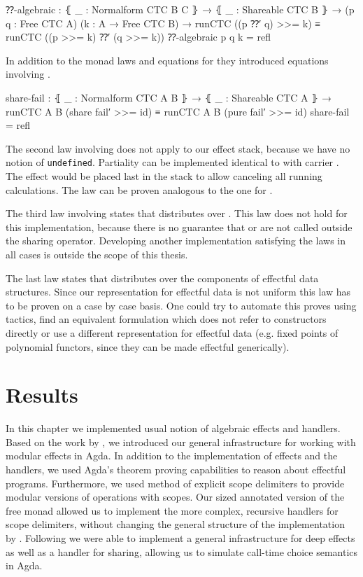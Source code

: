 \begin{code}
⁇-algebraic : ⦃ _ : Normalform CTC B C ⦄ → ⦃ _ : Shareable CTC B ⦄ →
  (p q : Free CTC A) (k : A → Free CTC B) →
  runCTC ((p ⁇′ q) >>= k) ≡ runCTC ((p >>= k) ⁇′ (q >>= k))
⁇-algebraic p q k = refl
\end{code}
In addition to the monad laws and equations for  they introduced
equations involving .

\begin{code}
share-fail : ⦃ _ : Normalform CTC A B ⦄ → ⦃ _ : Shareable CTC A ⦄ →
  runCTC {A} {B} (share fail′ >>= id) ≡ runCTC {A} {B} (pure fail′ >>= id)
share-fail = refl
\end{code}
The second law involving  does not apply to our effect
stack, because we have no notion of \texttt{undefined}.
Partiality can be implemented identical to  with carrier
.
The effect would be placed last in the stack to allow canceling all running
calculations.
The law can be proven analogous to the one for .

The third law involving  states that 
distributes over .
This law does not hold for this implementation, because there is no guarantee
that  or  are not called outside the sharing
operator.
Developing another implementation satisfying the laws in all cases is outside
the scope of this thesis.

The last law states that  distributes over the components of
effectful data structures.
Since our representation for effectful data is not uniform this law has to be
proven on a case by case basis.
One could try to automate this proves using tactics, find an equivalent
formulation which does not refer to constructors directly or use a different
representation for effectful data (e.g. fixed points of polynomial functors,
since they can be made effectful generically).


\section{Results}
\label{first-order:results}

In this chapter we implemented usual notion of algebraic effects and handlers.
Based on the work by \textcite{DBLP:conf/icfp/Brady13}, we introduced our
general infrastructure for working with modular effects in Agda.
In addition to the implementation of effects and the handlers, we used Agda's
theorem proving capabilities to reason about effectful programs.
Furthermore, we used \textcite{DBLP:conf/haskell/WuSH14} method of explicit
scope delimiters to provide modular versions of operations with scopes.
Our sized annotated version of the free monad allowed us to implement the more
complex, recursive handlers for scope delimiters, without changing the general
structure of the implementation by \textcite{DBLP:conf/haskell/WuSH14}.
Following \textcite{bunkenburg2019modeling} we were able to implement a general
infrastructure for deep effects as well as a handler for sharing, allowing us to
simulate call-time choice semantics in Agda.

